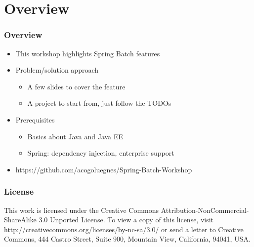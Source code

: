 \section{Overview}

\begin{frame}
\frametitle{Overview}
\begin{itemize}
	\item This workshop highlights Spring Batch features
	\item Problem/solution approach
	\begin{itemize}
		\item A few slides to cover the feature
		\item A project to start from, just follow the TODOs
	\end{itemize}
	\item Prerequisites
	\begin{itemize}
		\item Basics about Java and Java EE
		\item Spring: dependency injection, enterprise support
	\end{itemize}
	\item https://github.com/acogoluegnes/Spring-Batch-Workshop
\end{itemize}

\end{frame}

\begin{frame}
\frametitle{License}

This work is licensed under the Creative Commons Attribution-NonCommercial-ShareAlike 3.0 
Unported License. 
To view a copy of this license, 
visit http://creativecommons.org/licenses/by-nc-sa/3.0/ or 
send a letter to Creative Commons, 444 Castro Street, Suite 900, Mountain View, 
California, 94041, USA.

\end{frame}
